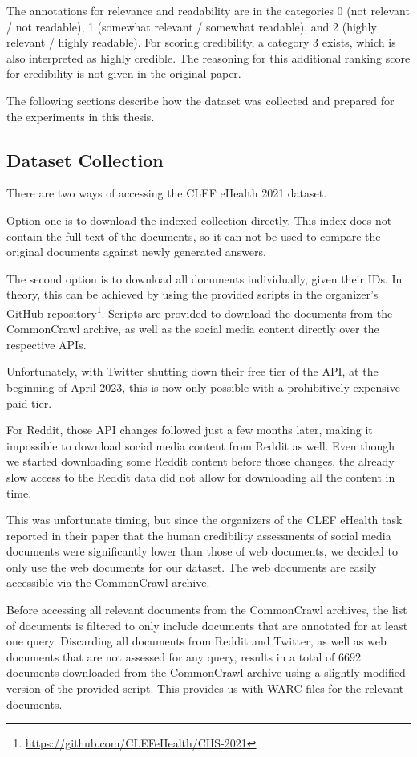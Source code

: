 The annotations for relevance and readability are in the categories 0 (not relevant / not readable), 1 (somewhat relevant / somewhat readable), and 2 (highly relevant / highly readable).
For scoring credibility, a category 3 exists, which is also interpreted as highly credible.
The reasoning for this additional ranking score for credibility is not given in the original paper.

The following sections describe how the dataset was collected and prepared for the experiments in this thesis.
\subsection{Dataset Collection}
There are two ways of accessing the CLEF eHealth 2021 dataset.

Option one is to download the indexed collection directly.
This index does not contain the full text of the documents, so it can not be used to compare the original documents against newly generated answers.

The second option is to download all documents individually, given their IDs.
In theory, this can be achieved by using the provided scripts in the organizer's GitHub repository\footnote{\url{https://github.com/CLEFeHealth/CHS-2021}}.
Scripts are provided to download the documents from the CommonCrawl archive, as well as the social media content directly over the respective APIs.

Unfortunately, with Twitter shutting down their free tier of the API, at the beginning of April 2023, this is now only possible with a prohibitively expensive paid tier.

For Reddit, those API changes followed just a few months later, making it impossible to download social media content from Reddit as well.
Even though we started downloading some Reddit content before those changes, the already slow access to the Reddit data did not allow for downloading all the content in time.

This was unfortunate timing, but since the organizers of the CLEF eHealth task reported in their paper that the human credibility assessments of social media documents were significantly lower than those of web documents, we decided to only use the web documents for our dataset.
The web documents are easily accessible via the CommonCrawl archive.


Before accessing all relevant documents from the CommonCrawl archives, the list of documents is filtered to only include documents that are annotated for at least one query.
Discarding all documents from Reddit and Twitter, as well as web documents that are not assessed for any query, results in a total of $6692$ documents downloaded from the CommonCrawl archive using a slightly modified version of the provided script.
This provides us with WARC files for the relevant documents.

